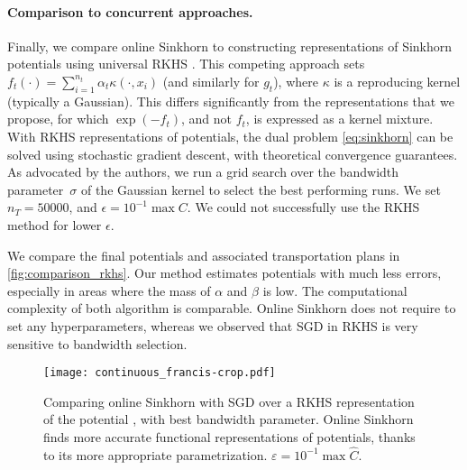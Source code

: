 \paragraph{Comparison to concurrent approaches.}\label{sec:compare}Finally, we compare online
Sinkhorn to constructing representations of Sinkhorn potentials using universal
RKHS \citep{2016-genevay-nips}. This competing approach sets $f_t(\cdot) =
\sum_{i=1}^{n_t} \alpha_t \kappa(\cdot, x_i)$ (and similarly for $g_t$), where $\kappa$ is
a reproducing kernel (typically a Gaussian). This differs significantly from the
representations that we propose, for which $\exp(-f_t)$, and not $f_t$, is
expressed as a kernel mixture. 
%
With RKHS representations of potentials, the
dual problem \eqref{eq:sinkhorn} can be solved using stochastic gradient
descent, with theoretical convergence guarantees. As advocated by the authors,
we run a grid search over the bandwidth parameter~$\sigma$ of the Gaussian kernel to select the best
performing runs. We set $n_T = 50000$, and $\epsilon = 10^{-1} \max C$. We could not successfully use the RKHS method for lower $\epsilon$.

We compare the final potentials and associated transportation plans in
\autoref{fig:comparison_rkhs}. Our method estimates potentials with much less
errors, especially in areas where the mass of $\alpha$ and $\beta$ is low. The
computational complexity of both algorithm is comparable. Online Sinkhorn does
not require to set any hyperparameters, whereas we observed that SGD in RKHS is very
sensitive to bandwidth selection.

\begin{figure}[t]
    \centering
    \texttt{[image: continuous\_francis-crop.pdf]}
    \caption{Comparing online Sinkhorn with SGD over a RKHS representation of the potential \citep{2016-genevay-nips}, with best bandwidth parameter. Online Sinkhorn finds more accurate functional representations of potentials, thanks to its more appropriate parametrization. $\varepsilon = 10^{-1} \max \hat C$.}
    \label{fig:comparison_rkhs}
\end{figure}